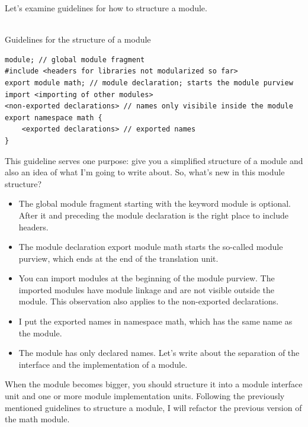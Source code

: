 
Let’s examine guidelines for how to structure a module.

\hspace*{\fill} \\ %
\noindent
Guidelines for the structure of a module
\begin{lstlisting}[style=styleCXX]
module; // global module fragment
#include <headers for libraries not modularized so far>
export module math; // module declaration; starts the module purview
import <importing of other modules>
<non-exported declarations> // names only visibile inside the module
export namespace math {
	<exported declarations> // exported names
}
\end{lstlisting}

This guideline serves one purpose: give you a simplified structure of a module and also an idea of what I’m going to write about. So, what’s new in this module structure?

\begin{itemize}
\item 
The global module fragment starting with the keyword module is optional. After it and preceding the module declaration is the right place to include headers.

\item 
The module declaration export module math starts the so-called module purview, which ends at the end of the translation unit.

\item 
You can import modules at the beginning of the module purview. The imported modules have module linkage and are not visible outside the module. This observation also applies to the non-exported declarations.

\item 
I put the exported names in namespace math, which has the same name as the module.

\item 
The module has only declared names. Let’s write about the separation of the interface and the implementation of a module.
\end{itemize}


When the module becomes bigger, you should structure it into a module interface unit and one or more module implementation units. Following the previously mentioned guidelines to structure a module, I will refactor the previous version of the math module.

